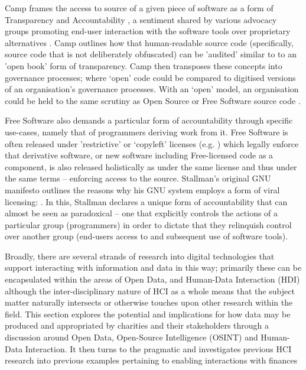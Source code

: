 Camp frames the access to source of a given piece of software as a form of Transparency and Accountability \cite{camp_varieties_2006}, a sentiment shared by various advocacy groups promoting end-user interaction with the software tools over proprietary alternatives \cite{pfaff_open_1998, balter_6_2015}. Camp outlines how that human-readable source code (specifically, source code that is not deliberately obfuscated) can be 'audited' similar to to an 'open book' form of transparency. Camp then transposes these concepts into governance processes; where `open' code could be compared to digitised versions of an organisation's governance processes. With an `open' model, an organisation could be held to the same scrutiny as Open Source or Free Software source code \cite{camp_varieties_2006}.  

Free Software also demands a particular form of accountability through specific use-cases, namely that of programmers deriving work from it. Free Software is often released under 'restrictive' or `copyleft' licenses (e.g. \cite{free_software_foundation_gnu_2007}) which legally enforce that derivative software, or new software including Free-licensed code as a component, is also released holistically as under the same license and thus under the same terms -- enforcing access to the source. Stallman's original GNU manifesto outlines the reasons why his GNU system employs a form of viral licensing:  \cite{stallman_gnu_1985}. In this, Stallman declares a unique form of accountability that can almost be seen as paradoxical -- one that explicitly controls the actions of a particular group (programmers) in order to dictate that they relinquish control over another group (end-users access to and subsequent use of software tools).


Broadly, there are several strands of research into digital technologies that support interacting with information and data in this way; primarily these can be encapsulated within the areas of Open Data, and Human-Data Interaction (HDI) although the inter-disciplinary nature of HCI as a whole means that the subject matter naturally intersects or otherwise touches upon other research within the field. This section explores the potential and implications for how data may be produced and appropriated by charities and their stakeholders through a discussion around Open Data, Open-Source Intelligence (OSINT) and Human-Data Interaction. It then turns to the pragmatic and investigates previous HCI research into previous examples pertaining to enabling interactions with finances




